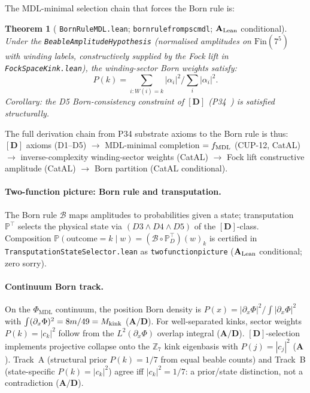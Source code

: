 \documentclass[11pt]{article}
\newtheorem{theorem}{Theorem}[section]
\theoremstyle{remark}
\newcommand{\PHIMDL}{\Phi_{\mathrm{MDL}}}
\newcommand{\ZS}{\mathbb{Z}_7}
\newcommand{\lean}[1]{%
  \penalty-100
  \begingroup\def\_{\textunderscore\allowbreak}\texttt{#1}\endgroup}
\newcommand{\CatA}{\textbf{A}}
\newcommand{\CatAL}{\ensuremath{\textbf{A}_{\rm Lean}}}
\newcommand{\CatAD}{\textbf{A/D}}
\begin{document}
The MDL-minimal selection chain that forces the Born rule is:

\begin{theorem}[\lean{BornRuleMDL.lean};
  \lean{born\_rule\_from\_psc\_mdl}; \CatAL{} conditional]
  \label{thm:born_mdl}
  Under the \lean{BeableAmplitudeHypothesis} (normalised amplitudes on
  $\text{Fin}(7^5)$ with winding labels, constructively supplied by the
  Fock lift in \lean{FockSpaceKink.lean}),
  the winding-sector Born weights satisfy:
  \begin{equation}
    P(k) = \sum_{i: W(i)=k} |\alpha_i|^2 \big/ \sum_i |\alpha_i|^2.
  \end{equation}
  Corollary: the D5 Born-consistency constraint of $[\mathbf{D}]$
  (P34~\cite{SpivackGTEMobius}) is satisfied structurally.
\end{theorem}

The full derivation chain from P34 substrate axioms to the Born rule is
thus: $[\mathbf{D}]$ axioms (D1--D5)
$\to$ MDL-minimal completion $= f_{\rm MDL}$ (CUP-12, CatAL)
$\to$ inverse-complexity winding-sector weights (CatAL)
$\to$ Fock lift constructive amplitude (CatAL)
$\to$ Born partition (CatAL conditional).

\paragraph{Two-function picture: Born rule and transputation.}
The Born rule $\mathcal{B}$ maps amplitudes to probabilities given a state;
transputation $\mathbb{P}^\top$ selects the physical state via
$(D3 \land D4 \land D5)$ of the $[\mathbf{D}]$-class.
Composition $\mathbb{P}(\text{outcome}=k\mid w)=(\mathcal{B}\circ\mathbb{P}^\top_D)(w)_k$
is certified in \lean{TransputationStateSelector.lean} as
\lean{two\_function\_picture} (\CatAL{} conditional; zero sorry).

\paragraph{Continuum Born track.}
On the $\PHIMDL$ continuum, the position Born density is
$P(x)=|\partial_x\Phi|^2/\int|\partial_x\Phi|^2$ with
$\int(\partial_x\Phi)^2=8m/49=M_{\rm kink}$ ($\CatAD$).
For well-separated kinks, sector weights $P(k)=|c_k|^2$ follow from the
$L^2(\partial_x\Phi)$ overlap integral ($\CatAD$).
$[\mathbf{D}]$-selection implements projective collapse onto the $\ZS$ kink
eigenbasis with $P(j)=|c_j|^2$ ($\CatA$).
Track~A (structural prior $P(k)=1/7$ from equal beable counts) and Track~B
(state-specific $P(k)=|c_k|^2$) agree iff $|c_k|^2=1/7$: a prior/state
distinction, not a contradiction ($\CatAD$).
\end{document}
